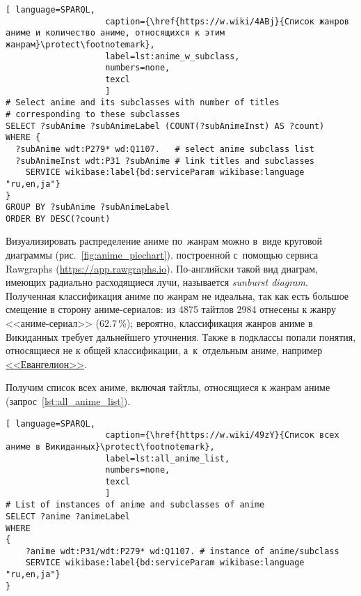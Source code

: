\begin{lstlisting}[ language=SPARQL, 
                    caption={\href{https://w.wiki/4ABj}{Список жанров аниме и количество аниме, относящихся к этим жанрам}\protect\footnotemark},
                    label=lst:anime_w_subclass,
                    numbers=none,
                    texcl 
                    ]
# Select anime and its subclasses with number of titles
# corresponding to these subclasses
SELECT ?subAnime ?subAnimeLabel (COUNT(?subAnimeInst) AS ?count)
WHERE {
  ?subAnime wdt:P279* wd:Q1107.   # select anime subclass list
  ?subAnimeInst wdt:P31 ?subAnime # link titles and subclasses
    SERVICE wikibase:label{bd:serviceParam wikibase:language "ru,en,ja"}
}
GROUP BY ?subAnime ?subAnimeLabel
ORDER BY DESC(?count)
\end{lstlisting}%


Визуализировать распределение аниме по~жанрам можно в~виде 
круговой диаграммы (рис.~\ref{fig:anime_piechart}). 
построенной с~помощью сервиса 
Rawgraphs (\href{https://app.rawgraphs.io}{https://app.rawgraphs.io}). 
По-английски такой вид диаграм, имеющих радиально расходящиеся лучи, 
называется \emph{sunburst diagram}. 
%
Полученная классификация аниме по жанрам не идеальна, 
так как есть большое смещение в сторону аниме-сериалов: 
из \num{4875} тайтлов \num{2984} отнесены к жанру <<аниме-сериал>> (\num{62,7}\,\%); 
вероятно, классификация жанров аниме в Викиданных требует дальнейшего уточнения. 
Также в подклассы попали понятия, относящиеся не к общей классификации, 
а~к~отдельным аниме, например \href{https://w.wiki/4L5p}{<<Евангелион>>}.



\newpage
Получим список всех аниме, включая тайтлы, относящиеся к жанрам аниме (запрос~\ref{lst:all_anime_list}).

\begin{lstlisting}[ language=SPARQL, 
                    caption={\href{https://w.wiki/49zY}{Список всех аниме в Викиданных}\protect\footnotemark},
                    label=lst:all_anime_list,
                    numbers=none,
                    texcl 
                    ]
# List of instances of anime and subclasses of anime
SELECT ?anime ?animeLabel
WHERE
{
    ?anime wdt:P31/wdt:P279* wd:Q1107. # instance of anime/subclass
    SERVICE wikibase:label{bd:serviceParam wikibase:language "ru,en,ja"}
}
\end{lstlisting}%

